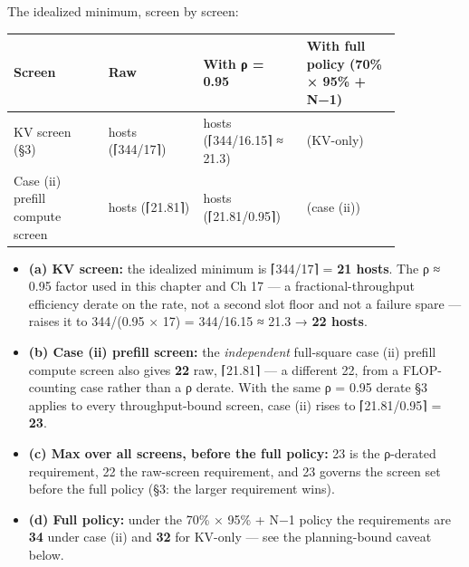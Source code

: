 The idealized minimum, screen by screen:

\nopagebreak[4]
\begin{longtable}[]{@{}
  >{\raggedright\arraybackslash}p{0.2127\linewidth}
  >{\raggedright\arraybackslash}p{0.2127\linewidth}
  >{\raggedright\arraybackslash}p{0.2127\linewidth}
  >{\raggedright\arraybackslash}p{0.2127\linewidth}@{}}
\toprule\noalign{}
\begin{minipage}[b]{\linewidth}\raggedright
Screen
\end{minipage} & \begin{minipage}[b]{\linewidth}\raggedright
Raw
\end{minipage} & \begin{minipage}[b]{\linewidth}\raggedright
With ρ = 0.95
\end{minipage} & \begin{minipage}[b]{\linewidth}\raggedright
With full policy (70\% × 95\% + N−1)
\end{minipage} \\
\midrule\noalign{}
\endhead
\bottomrule\noalign{}
\endlastfoot
KV screen (§3) & 21 hosts (⌈344/17⌉) & 22 hosts (⌈344/16.15⌉ ≈ 21.3) &
32 (KV-only) \\
\noalign{\label{tab:20.2}}
Case (ii) prefill compute screen & 22 hosts (⌈21.81⌉) & 23 hosts
(⌈21.81/0.95⌉) & 34 (case (ii)) \\
\end{longtable}

\begin{itemize}
\tightlist
\item
  \textbf{(a) KV screen:} the idealized minimum is ⌈344/17⌉ = \textbf{21
  hosts}. The ρ ≈ 0.95 factor used in this chapter and Ch 17 --- a
  fractional-throughput efficiency derate on the rate, not a second slot
  floor and not a failure spare --- raises it to 344/(0.95 × 17) =
  344/16.15 ≈ 21.3 → \textbf{22 hosts}.
\item
  \textbf{(b) Case (ii) prefill screen:} the \emph{independent}
  full-square case (ii) prefill compute screen also gives \textbf{22}
  raw, ⌈21.81⌉ --- a different 22, from a FLOP-counting case rather than
  a ρ derate. With the same ρ = 0.95 derate §3 applies to every
  throughput-bound screen, case (ii) rises to ⌈21.81/0.95⌉ =
  \textbf{23}.
\item
  \textbf{(c) Max over all screens, before the full policy:} 23 is the
  ρ-derated requirement, 22 the raw-screen requirement, and 23 governs
  the screen set before the full policy (§3: the larger requirement
  wins).
\item
  \textbf{(d) Full policy:} under the 70\% × 95\% + N−1 policy the
  requirements are \textbf{34} under case (ii) and \textbf{32} for
  KV-only --- see the planning-bound caveat below.
\end{itemize}

